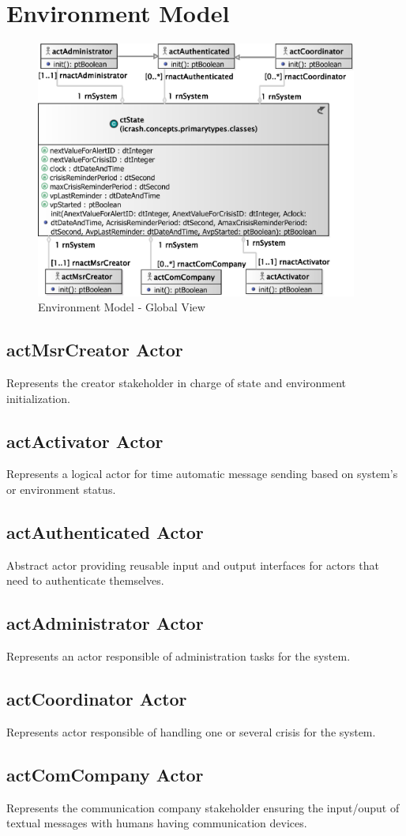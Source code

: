    

\section{Environment Model}

\begin{figure}[H]
\begin{center}
  \includegraphics[width=400px]{images/analysis/environment-model/global/01/em-gv-01.eps}
  \caption{Environment Model - Global View}
  \label{env-global}
\end{center}
\end{figure}

\subsection{actMsrCreator Actor}
Represents the creator stakeholder in charge of state and environment
initialization.

\subsection{actActivator Actor}
Represents a logical actor for time automatic message sending based on system’s
or environment status.

\subsection{actAuthenticated Actor}
Abstract actor providing reusable input and output interfaces for actors that
need to authenticate themselves.

\subsection{actAdministrator Actor}
Represents an actor responsible of administration tasks for the \mysystemname
system. 

\subsection{actCoordinator Actor}
Represents actor responsible of handling one or several crisis for the
\mysystemname system.

\subsection{actComCompany Actor}
Represents the communication company stakeholder ensuring the input/ouput of
textual messages with humans having communication devices.
